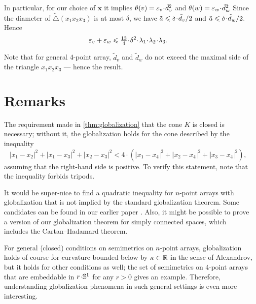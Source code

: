 \documentclass[a4paper,10pt]{article}
\begin{document}
In particular, for our choice of $\bm{x}$ it implies $\theta(v)=\eps_v\cdot \tilde d_v^2$ and $\theta(w)=\eps_w\cdot \tilde d_w^2$
Since the diameter of $\tilde\triangle(x_1x_2x_3)$ is at most $\delta$, we have
$\tilde a\z\le \delta\cdot \tilde d_v/2$ and
$\tilde a\z\le \delta\cdot \tilde d_w/2$.
Hence
\[\eps_v+\eps_w\le \tfrac{13}4\cdot \delta^2\cdot\lambda_1\cdot\lambda_2\cdot\lambda_3.\]

Note that for general 4-point array, $\tilde d_v$ and $\tilde d_w$ do not exceed the maximal side of the triangle $x_1x_2x_3$ --- hence the result.
\qeds

\section{Remarks}

The requirement made in \ref{thm:globalization} that the cone $K$ is closed is necessary;
without it, the globalization holds for the cone described by the inequality
\[|x_1-x_2|^2+|x_1-x_3|^2+|x_2-x_3|^2<4\cdot(|x_1-x_4|^2+|x_2-x_4|^2+|x_3-x_4|^2),\]
assuming that the right-hand side is positive.
To verify this statement, note that the inequality forbids tripods.

It would be super-nice to find a quadratic inequality for $n$-point arrays with globalization that is not implied by the standard globalization theorem.
Some candidates can be found in our earlier paper \cite{lebedeva-petrunin-zolotov}.
Also, it might be possible to prove a version of our globalization theorem
for simply connected spaces, which includes the Cartan--Hadamard theorem.

For general (closed) conditions on semimetrics on $n$-point arrays, globalization holds of course for curvature bounded below by $\kappa\in \mathbb{R}$ in the sense of Alexandrov,
but it holds for other conditions as well;
the set of semimetrics on $4$-point arrays that are embeddable in $r\cdot\SSS^1$ for any $r>0$ gives an example.
Therefore, understanding globalization phenomena in such general settings is even more interesting.

{\sloppy
\def\emph{\textit}
\printbibliography[heading=bibintoc]
\fussy
}
\end{document}
